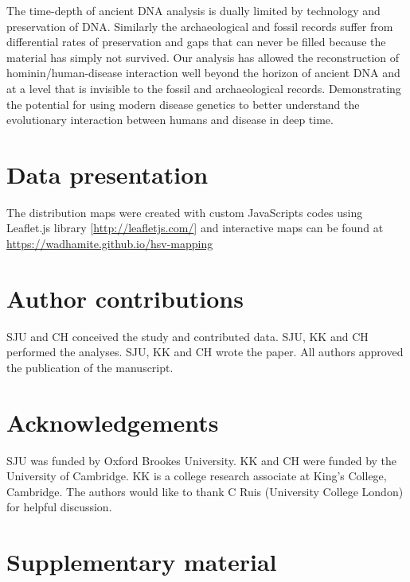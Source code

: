 \documentclass[fleqn,10pt]{wlscirep}
\begin{document}
The time-depth of ancient DNA analysis is dually limited by technology and preservation of DNA. Similarly the archaeological and fossil records suffer from differential rates of preservation and gaps that can never be filled because the material has simply not survived.  Our analysis has allowed the reconstruction of hominin/human-disease interaction well beyond the horizon of ancient DNA and at a level that is invisible to the fossil and archaeological records. Demonstrating the potential for using modern disease genetics to better understand the evolutionary interaction between humans and disease in deep time.



\section*{Data presentation}
The distribution maps were created with custom JavaScripts codes using Leaflet.js library [\url{http://leafletjs.com/}] and interactive maps can be found at \url{https://wadhamite.github.io/hsv-mapping}

\section*{Author contributions}
SJU and CH conceived the study and contributed data. SJU, KK and CH performed the analyses. SJU, KK and CH wrote the paper. All authors approved the publication of the manuscript.

\section*{Acknowledgements}
SJU was funded by Oxford Brookes University. KK and CH were funded by the University of Cambridge. KK is a college research associate at King’s College, Cambridge. The authors would like to thank C Ruis (University College London) for helpful discussion. 

\printbibliography

\clearpage
\section*{Supplementary material}
\renewcommand\thefigure{A.\arabic{figure}}    
\setcounter{figure}{0} 
\renewcommand\thetable{A.\arabic{figure}}    
\setcounter{table}{0} 
\end{document}
